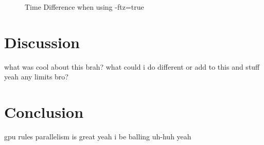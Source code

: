 \begin{figure}[H]
    \centering
    \caption{Time Difference when using -ftz=true}
    \label{fig:swappinggggggg}
    
\end{figure}

\section{Discussion}
what was cool about this brah?
what could i do different or add to this and stuff yeah
any limits bro?

\section{Conclusion}
gpu rules parallelism is great yeah i be balling uh-huh yeah
